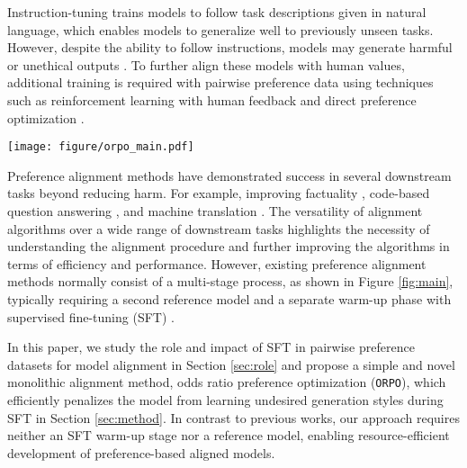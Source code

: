 Instruction-tuning \citep{wei2022finetuned, alpaca, wang2023far, zhou2023lima} trains models to follow task descriptions given in natural language, which enables models to generalize well to previously unseen tasks. However, despite the ability to follow instructions, models may generate harmful or unethical outputs \citep{carlini2021extracting, gehman-etal-2020-realtoxicityprompts, pryzant-etal-2023-automatic}.  To further align these models with human values, additional training is required with pairwise preference data using techniques such as reinforcement learning with human feedback \citep[RLHF]{ziegler2020finetuning, stiennon2022learning} and direct preference optimization \citep[DPO]{rafailov2023direct}.

\begin{figure*}[hbt!]
    \centering
    \texttt{[image: figure/orpo\_main.pdf]}
    \caption{Comparison of model alignment techniques. \texttt{ORPO} aligns the language model \textit{without a reference model} in a single-step manner by assigning a weak penalty to the rejected responses and a strong adaptation signal to the chosen responses with a simple log odds ratio term appended to the negative log-likelihood loss.}
    \label{fig:main}
\end{figure*}

Preference alignment methods have demonstrated success in several downstream tasks beyond reducing harm. For example, improving factuality \citep{tian2023finetuning, cheng2024ai, chen2024grath}, code-based question answering \citep{gorbatovski2024reinforcement}, and machine translation \citep{ramos2023aligning}. The versatility of alignment algorithms over a wide range of downstream tasks highlights the necessity of understanding the alignment procedure and further improving the algorithms in terms of efficiency and performance. However, existing preference alignment methods normally consist of a multi-stage process, as shown in Figure \ref{fig:main}, typically requiring a second reference model and a separate warm-up phase with supervised fine-tuning (SFT) \citep{ziegler2020finetuning, rafailov2023direct, wu2023pairwise}. 

In this paper, we study the role and impact of SFT in pairwise preference datasets for model alignment in Section \ref{sec:role} and propose a simple and novel monolithic alignment method, odds ratio preference optimization (\texttt{ORPO}), which efficiently penalizes the model from learning undesired generation styles during SFT in Section \ref{sec:method}. In contrast to previous works, our approach requires neither an SFT warm-up stage nor a reference model, enabling resource-efficient development of preference-based aligned models. 

